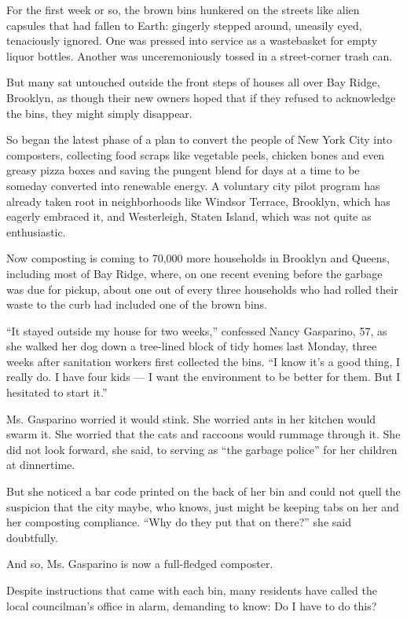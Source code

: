 For the first week or so, the brown bins hunkered on the streets like
alien capsules that had fallen to Earth: gingerly stepped around,
uneasily eyed, tenaciously ignored. One was pressed into service as a
wastebasket for empty liquor bottles. Another was unceremoniously tossed
in a street-corner trash can.

But many sat untouched outside the front steps of houses all over Bay
Ridge, Brooklyn, as though their new owners hoped that if they refused
to acknowledge the bins, they might simply disappear.

So began the latest phase of a plan to convert the people of New York
City into composters, collecting food scraps like vegetable peels,
chicken bones and even greasy pizza boxes and saving the pungent blend
for days at a time to be someday converted into renewable energy. A
voluntary city pilot program has already taken root in neighborhoods
like Windsor Terrace, Brooklyn, which has eagerly embraced it, and
Westerleigh, Staten Island, which was not quite as enthusiastic.

Now composting is coming to 70,000 more households in Brooklyn and
Queens, including most of Bay Ridge, where, on one recent evening before
the garbage was due for pickup, about one out of every three households
who had rolled their waste to the curb had included one of the brown
bins.

``It stayed outside my house for two weeks,'' confessed Nancy Gasparino,
57, as she walked her dog down a tree-lined block of tidy homes last
Monday, three weeks after sanitation workers first collected the bins.
``I know it's a good thing, I really do. I have four kids --- I want the
environment to be better for them. But I hesitated to start it.''

Ms. Gasparino worried it would stink. She worried ants in her kitchen
would swarm it. She worried that the cats and raccoons would rummage
through it. She did not look forward, she said, to serving as ``the
garbage police'' for her children at dinnertime.

But she noticed a bar code printed on the back of her bin and could not
quell the suspicion that the city maybe, who knows, just might be
keeping tabs on her and her composting compliance. ``Why do they put
that on there?'' she said doubtfully.

And so, Ms. Gasparino is now a full-fledged composter.

Despite instructions that came with each bin, many residents have called
the local councilman's office in alarm, demanding to know: Do I have to
do this?

